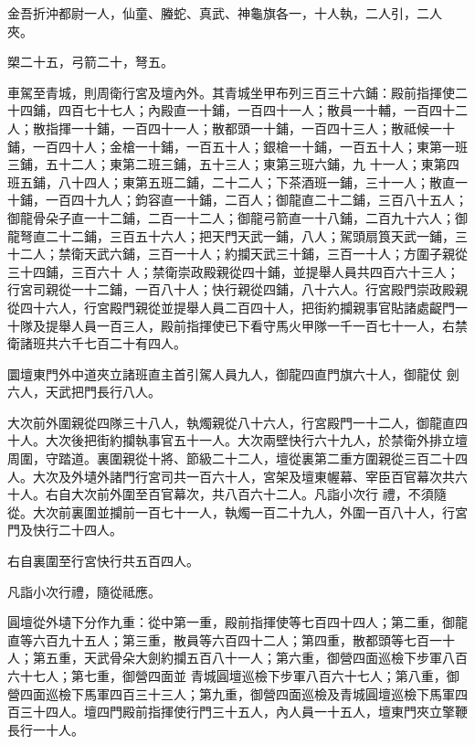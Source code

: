 \begin{pinyinscope}
 金吾折沖都尉一人，仙童、螣蛇、真武、神龜旗各一，十人執，二人引，二人
 夾。



 槊二十五，弓箭二十，弩五。



 車駕至青城，則周衛行宮及壇內外。其青城坐甲布列三百三十六鋪：殿前指揮使二十四鋪，四百七十七人；內殿直一十鋪，一百四十一人；散員一十輔，一百四十二人；散指揮一十鋪，一百四十一人；散都頭一十鋪，一百四十三人；散祗候一十鋪，一百四十人；金槍一十鋪，一百五十人；銀槍一十鋪，一百五十人；東第一班三鋪，五十二人；東第二班三鋪，五十三人；東第三班六鋪，九
 十一人；東第四班五鋪，八十四人；東第五班二鋪，二十二人；下茶酒班一鋪，三十一人；散直一十鋪，一百四十九人；鈞容直一十鋪，二百人；御龍直二十二鋪，三百八十五人；御龍骨朵子直一十二鋪，二百一十二人；御龍弓箭直一十八鋪，二百九十六人；御龍弩直二十二鋪，三百五十六人；把天門天武一鋪，八人；駕頭扇筤天武一鋪，三十二人；禁衛天武六鋪，三百一十人；約攔天武三十鋪，三百一十人；方圍子親從三十四鋪，三百六十
 人；禁衛崇政殿親從四十鋪，並提舉人員共四百六十三人；行宮司親從一十二鋪，一百八十人；快行親從四鋪，八十六人。行宮殿門崇政殿親從四十六人，行宮殿門親從並提舉人員二百四十人，把街約攔親事官貼諸處齪門一十隊及提舉人員一百三人，殿前指揮使已下看守馬火甲隊一千一百七十一人，右禁衛諸班共六千七百二十有四人。



 圜壇東門外中道夾立諸班直主首引駕人員九人，御龍四直門旗六十人，御龍仗
 劍六人，天武把門長行八人。



 大次前外圍親從四隊三十八人，執燭親從八十六人，行宮殿門一十二人，御龍直四十人。大次後把街約攔執事官五十一人。大次兩壁快行六十九人，於禁衛外排立壇周圍，守踏道。裏圍親從十將、節級二十二人，壇從裏第二重方圍親從三百二十四人。大次及外壝外諸門行宮司共一百六十人，宮架及壇東幄幕、宰臣百官幕次共六十人。右自大次前外圍至百官幕次，共八百六十二人。凡詣小次行
 禮，不須隨從。大次前裏圍並攔前一百七十一人，執燭一百二十九人，外圍一百八十人，行宮門及快行二十四人。



 右自裏圍至行宮快行共五百四人。



 凡詣小次行禮，隨從祗應。



 圓壇從外壝下分作九重：從中第一重，殿前指揮使等七百四十四人；第二重，御龍直等六百九十五人；第三重，散員等六百四十二人；第四重，散都頭等七百一十人；第五重，天武骨朵大劍約攔五百八十一人；第六重，御營四面巡檢下步軍八百六十七人；第七重，御營四面並
 青城圓壇巡檢下步軍八百六十七人；第八重，御營四面巡檢下馬軍四百三十三人；第九重，御營四面巡檢及青城圓壇巡檢下馬軍四百三十四人。壇四門殿前指揮使行門三十五人，內人員一十五人，壇東門夾立擎鞭長行一十人。




\end{pinyinscope}
